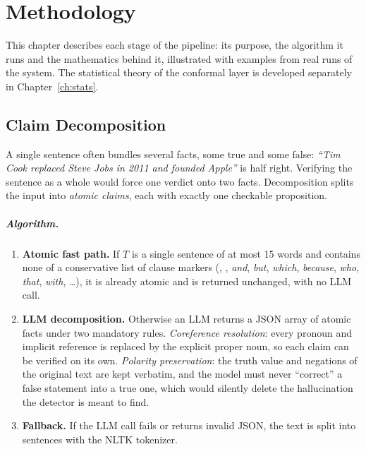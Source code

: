 \chapter{Methodology}
\label{ch:method}

This chapter describes each stage of the pipeline: its purpose, the algorithm it runs and the mathematics behind it, illustrated with examples from real runs of the system. The statistical theory of the conformal layer is developed separately in Chapter~\ref{ch:stats}.

\section{Claim Decomposition}
\label{sec:decomp}

A single sentence often bundles several facts, some true and some false: \emph{``Tim Cook replaced Steve Jobs in 2011 and founded Apple''} is half right. Verifying the sentence as a whole would force one verdict onto two facts. Decomposition splits the input into \emph{atomic claims}, each with exactly one checkable proposition.

\paragraph{Algorithm.}
\begin{enumerate}[itemsep=0.2em]
  \item \textbf{Atomic fast path.} If $T$ is a single sentence of at most 15 words and contains none of a conservative list of clause markers (\code{;}, \code{,}, \emph{and}, \emph{but}, \emph{which}, \emph{because}, \emph{who}, \emph{that}, \emph{with}, \dots), it is already atomic and is returned unchanged, with no LLM call.
  \item \textbf{LLM decomposition.} Otherwise an LLM returns a JSON array of atomic facts under two mandatory rules. \emph{Coreference resolution}: every pronoun and implicit reference is replaced by the explicit proper noun, so each claim can be verified on its own. \emph{Polarity preservation}: the truth value and negations of the original text are kept verbatim, and the model must never ``correct'' a false statement into a true one, which would silently delete the hallucination the detector is meant to find.
  \item \textbf{Fallback.} If the LLM call fails or returns invalid JSON, the text is split into sentences with the NLTK tokenizer.
\end{enumerate}

